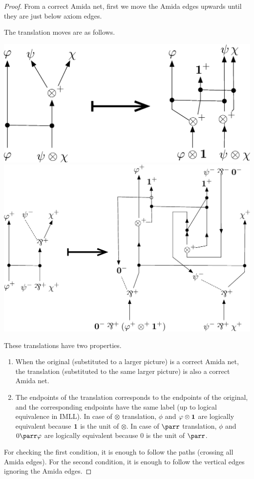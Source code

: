  \begin{proof}
  From a correct Amida net, first we move the Amida edges upwards
  until they are just below axiom edges.

The translation moves are as follows.
 \begin{center}
\includegraphics[scale=0.4]{tensor-move.eps}
\vskip 3cm
\includegraphics[scale=0.35]{parr-move.eps}
 \end{center}
These translations have two properties.
\begin{enumerate}
 \item When the original (substituted to a larger picture)
       is a correct Amida net, the translation (substituted to the same
       larger picture) is also a correct Amida net.
 \item The endpoints of the translation corresponds to the endpoints of
       the original, and the corresponding endpoints have the same label
       (up to logical equivalence in IMLL).  In case of $\otimes$
       translation, $\phi$ and
       $\varphi\otimes \mathbf{1}$ are logically equivalent because $\mathbf{1}$ is the
       unit of $\otimes$.
       In case of $\parr$ translation, $\phi$ and $0\parr \phi$ are
       logically equivalent because $0$ is the unit of $\parr$.
\end{enumerate}
For checking the first condition, it is enough to follow the paths
(crossing all Amida edges).
For the second condition, it is enough to follow the vertical edges
ignoring the Amida edges.


\end{proof}
